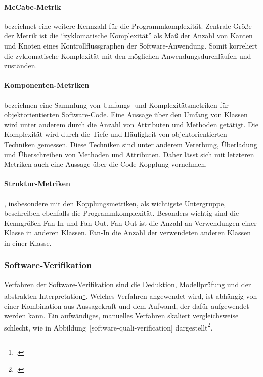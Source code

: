 \paragraph{McCabe-Metrik} bezeichnet eine weitere Kennzahl für die Programmkomplexität. Zentrale Größe der Metrik ist die ``zyklomatische Komplexität'' als Maß der Anzahl von Kanten und Knoten eines Kontrollflussgraphen der Software-Anwendung. Somit korreliert die zyklomatische Komplexität mit den möglichen Anwendungsdurchläufen und -zuständen.

\paragraph{Komponenten-Metriken} bezeichnen eine Sammlung von Umfangs- und Komplexitätsmetriken für objektorientierten Software-Code. Eine Aussage über den Umfang von Klassen wird unter anderem durch die Anzahl von Attributen und Methoden getätigt. Die Komplexität wird durch die Tiefe und Häufigkeit von objektorientierten Techniken gemessen. Diese Techniken sind unter anderem Vererbung, Überladung und Überschreiben von Methoden und Attributen. Daher lässt sich mit letzteren Metriken auch eine Aussage über die Code-Kopplung vornehmen.

\paragraph{Struktur-Metriken}\label{par:structure-metrics}, insbesondere mit den Kopplungsmetriken, als wichtigste Untergruppe, beschreiben ebenfalls die Programmkomplexität. Besonders wichtig sind die Kenngrößen Fan-In und Fan-Out. Fan-Out ist die Anzahl an Verwendungen einer Klasse in anderen Klassen. Fan-In die Anzahl der verwendeten anderen Klassen in einer Klasse. 

\subsubsection{Software-Verifikation}
\label{subsubsec:base-verification}
Verfahren der Software-Verifikation sind die Deduktion, Modellprüfung und der abstrakten Interpretation\footcite[S. 333 ff][]{software-quality2008}. Welches Verfahren angewendet wird, ist abhängig von einer Kombination aus Aussagekraft und dem Aufwand, der dafür aufgewendet werden kann. Ein aufwändiges, manuelles Verfahren skaliert vergleichsweise schlecht, wie in Abbildung~\ref{software-quali-verification} dargestellt\footcite[S. 337][]{software-quality2008}.

